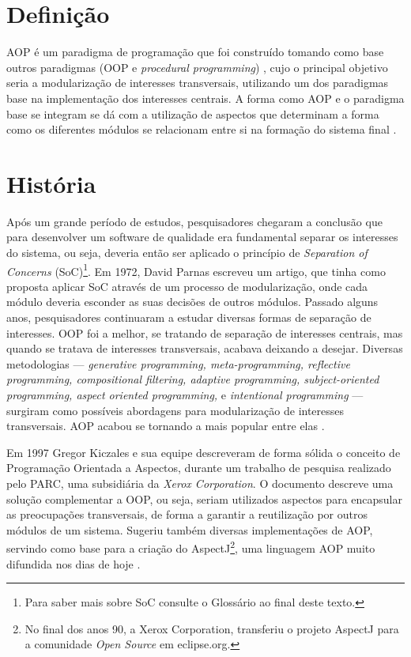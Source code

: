 \documentclass[tc,oneside]{iiufrgs}
\begin{document}
\section{Definição}
AOP é um paradigma de programação que foi construído tomando como base outros paradigmas (OOP e \textit{procedural programming}) , cujo o principal objetivo seria a modularização de interesses transversais, utilizando um dos paradigmas base na implementação dos interesses centrais. A forma como AOP e o paradigma base se integram se dá com a utilização de aspectos que determinam a forma como os diferentes módulos se relacionam entre si na formação do sistema final \cite{laddad2003aspectj}.
\section{História}
Após um grande período de estudos, pesquisadores chegaram a conclusão que para desenvolver um software de qualidade era fundamental separar os interesses do sistema, ou seja, deveria então ser aplicado o princípio de \textit{Separation of Concerns} (SoC)\footnote{Para saber mais sobre SoC consulte o Glossário ao final deste texto.}. Em 1972, David Parnas escreveu um artigo, que tinha como  proposta aplicar SoC através de um processo de modularização, onde cada módulo deveria esconder as suas decisões de outros módulos. Passado alguns anos, pesquisadores continuaram a estudar diversas formas de separação de interesses. OOP foi a melhor, se tratando de separação de interesses centrais, mas quando se tratava de interesses transversais, acabava deixando a desejar. Diversas metodologias — \textit{generative programming, meta-programming, reflective programming, compositional filtering, adaptive programming, subject-oriented programming, aspect oriented programming,} e  \textit{intentional programming} — surgiram como possíveis abordagens para modularização de interesses transversais. AOP acabou se tornando a mais popular entre elas \cite{laddad2003aspectj}.

Em 1997 Gregor Kiczales e sua equipe descreveram de forma sólida o conceito de Programação Orientada a Aspectos, durante um trabalho de pesquisa realizado pelo PARC, uma subsidiária da \textit{Xerox Corporation}. O documento descreve uma solução complementar a OOP, ou seja, seriam utilizados aspectos para encapsular as preocupações transversais, de forma a garantir a reutilização por outros módulos de um sistema. Sugeriu também diversas implementações de AOP, servindo como base para a criação do AspectJ\footnote{No final dos anos 90, a Xerox Corporation, transferiu o projeto AspectJ para a comunidade \textit{Open Source} em eclipse.org.}, uma linguagem AOP muito difundida nos dias de hoje \cite{groves2013aop}.
\end{document}

